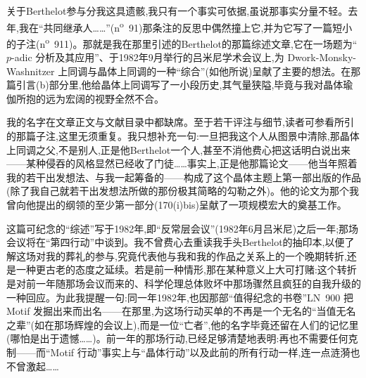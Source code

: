 关于Berthelot参与分我这具遗骸,我只有一个事实可依据,虽说那事实分量不轻。去年,我在“共同继承人……”(n\textsuperscript{o}~91)那条注的反思中偶然撞上它,并为它写了一篇短小的子注(n\textsuperscript{o}~911)。那就是我在那里引述的Berthelot的那篇综述文章,它在一场题为“$p$-adic 分析及其应用”、于1982年9月举行的吕米尼学术会议上,为 Dwork-Monsky-Washnitzer 上同调与晶体上同调的一种“综合”(如他所说)呈献了主要的想法。在那篇引言(b)部分里,他给晶体上同调写了一小段历史,其气量狭隘,毕竟与我对晶体瑜伽所抱的远为宏阔的视野全然不合。

我的名字在文章正文与文献目录中都缺席。至于若干评注与细节,读者可参看所引的那篇子注,这里无须重复。我只想补充一句:一旦把我这个人从图景中清除,那晶体上同调之父,不是别人,正是他Berthelot一个人,甚至不消他费心把这话明白说出来——某种侵吞的风格显然已经收了门徒……事实上,正是他那篇论文——他当年照着我的若干出发想法、与我一起筹备的——构成了这个晶体主题上第一部出版的作品(除了我自己就若干出发想法\dmark{}所做的那份极其简略的勾勒之外)。他的论文为那个我曾向他提出的纲领的至少第一部分(170(i)bis)呈献了一项规模宏大的奠基工作。

这篇可纪念的“综述”写于1982年,即“反常层会议”(1982年6月吕米尼)之后一年;那场会议将在“第四行动”中谈到。我不曾费心去重读我手头Berthelot的抽印本,以便了解这场对我的葬礼的参与,究竟代表他与我和我的作品之关系上的一个晚期转折,还是一种更古老的态度之延续。若是前一种情形,那在某种意义上大可打赌:这个转折是对前一年随那场会议而来的、科学伦理总体败坏中那场骤然且疯狂的自我升级的一种回应。为此我提醒一句:同一年1982年,也因那部“值得纪念的书卷”LN~900 把 Motif 发掘出来而出名——在那里,为这场行动买单的不再是一个无名的“当值无名之辈”(如在那场辉煌的会议上),而是一位“亡者”,他的名字毕竟还留在人们的记忆里(哪怕是出于遗憾……)。前一年的那场行动,已经足够清楚地表明:再也不需要任何克制——而“Motif 行动”事实上与“晶体行动”以及此前的所有行动一样,连一点涟漪也不曾激起……


